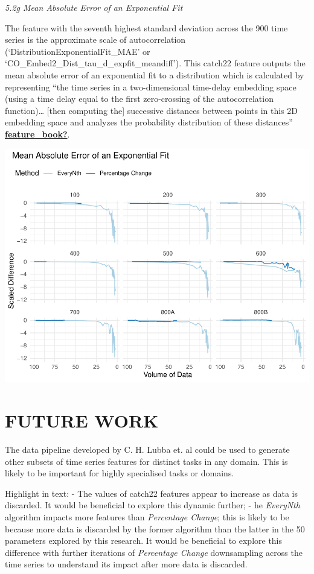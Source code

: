 \documentclass{article}
\begin{document}
\emph{5.2g Mean Absolute Error of an Exponential Fit}

The feature with the seventh highest standard deviation across the 900
time series is the approximate scale of autocorrelation
(`DistributionExponentialFit\_MAE' or
`CO\_Embed2\_Dist\_tau\_d\_expfit\_meandiff'). This catch22 feature
outputs the mean absolute error of an exponential fit to a distribution
which is calculated by representing ``the time series in a
two-dimensional time-delay embedding space (using a time delay equal to
the first zero-crossing of the autocorrelation function)\ldots{} {[}then
computing the{]} successive distances between points in this 2D
embedding space and analyzes the probability distribution of these
distances''
\protect\hyperlink{ref-feature_book}{\textbf{feature\_book?}}.

\includegraphics{210431461_CSC8639_Dissertation_files/figure-latex/MAE-1.pdf}

\hypertarget{future-work}{%
\section{FUTURE WORK}\label{future-work}}

\label{sec:headings}

The data pipeline developed by C. H. Lubba et. al could be used to
generate other subsets of time series features for distinct tasks in any
domain. This is likely to be important for highly specialised tasks or
domains.

Highlight in text: - The values of catch22 features appear to increase
as data is discarded. It would be beneficial to explore this dynamic
further; - he \emph{EveryNth} algorithm impacts more features than
\emph{Percentage Change}; this is likely to be because more data is
discarded by the former algorithm than the latter in the 50 parameters
explored by this research. It would be beneficial to explore this
difference with further iterations of \emph{Percentage Change}
downsampling across the time series to understand its impact after more
data is discarded.
\end{document}
